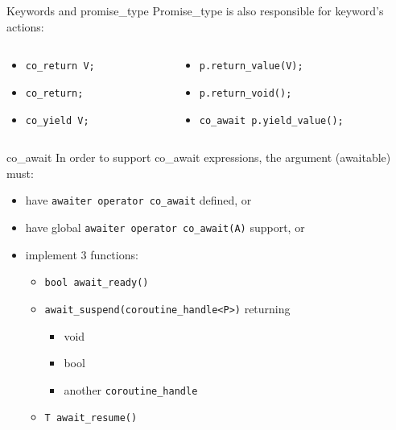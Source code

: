 \documentclass[10pt]{beamer}
\begin{document}
\begin{frame}{Keywords and promise\_type}
	Promise\_type is also responsible for keyword's actions:
	\vfill

	\begin{columns}
		\begin{column}{0.48\linewidth}
			\begin{footnotesize}
			\begin{itemize}[<+-|alert@+>]
				\item \texttt{co\_return V;}
				\item \texttt{co\_return;}
				\item \texttt{co\_yield V;}
			\end{itemize}
			\end{footnotesize}	
		\end{column}
		\begin{column}{0.48\linewidth}
			\begin{footnotesize}
			\begin{itemize}[<+-|alert@+>]
				\item<1- |alert@1> \texttt{p.return\_value(V);}
				\item<2- |alert@2> \texttt{p.return\_void();}
				\item<3- |alert@3> \texttt{co\_await p.yield\_value();}
			\end{itemize}
			\end{footnotesize}	
		\end{column}
	\end{columns}
\end{frame}

\begin{frame}{co\_await}
	In order to support \alert{co\_await} expressions, the argument (awaitable) must:
	\begin{itemize}[<+-|alert@+>]
		\item have \texttt{awaiter operator co\_await} defined, or
		\item have global \texttt{awaiter operator co\_await(A)} support, or
		\item implement 3 functions:
		\begin{itemize}
			\item \texttt{bool await\_ready()}
			\item \texttt{await\_suspend(coroutine\_handle<P>)} returning
			\begin{itemize}
				\item void 
				\item bool
				\item another \texttt{coroutine\_handle}
			\end{itemize}
			\item \texttt{T await\_resume()}
		\end{itemize}
	\end{itemize}
\end{frame}
\end{document}

